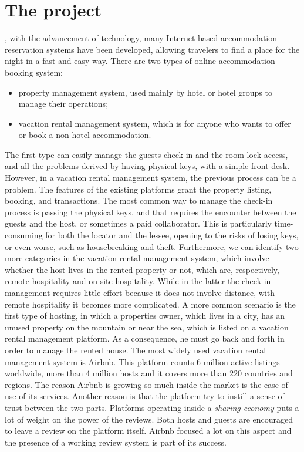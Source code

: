 \chapter{The project}
\label{cap:one}
, with the advancement of technology, many Internet-based accommodation reservation systems have been developed, allowing travelers to find a place for the night in a fast and easy way. There are two types of online accommodation booking system\cite{9295937}:
\begin{itemize}
    \item property management system, used mainly by hotel or hotel groups to manage their operations;
    \item vacation rental management system, which is for anyone who wants to offer or book a non-hotel accommodation.
\end{itemize}
The first type can easily manage the guests check-in and the room lock access, and all the problems derived by having physical keys, with a simple front desk. However, in a vacation rental management system, the previous process can be a problem. The features of the existing platforms grant the property listing, booking, and transactions. The most common way to manage the check-in process is passing the physical keys, and that requires the encounter between the guests and the host, or sometimes a paid collaborator. This is particularly time-consuming for both the locator and the lessee, opening to the risks of losing keys, or even worse, such as housebreaking and theft. 
Furthermore, we can identify two more categories in the vacation rental management system, which involve whether the host lives in the rented property or not, which are, respectively, remote hospitality and on-site hospitality\cite{10.1145/2675133.2675274}. While in the latter the check-in management requires little effort because it does not involve distance, with remote hospitality it becomes more complicated. A more common scenario is the first type of hosting, in which a properties owner, which lives in a city, has an unused property on the mountain or near the sea, which is listed on a vacation rental management platform. As a consequence, he must go back and forth in order to manage the rented house.
The most widely used vacation rental management system is Airbnb. This platform counts 6 million active listings worldwide, more than 4 million hosts and it covers more than 220 countries and regions. The reason Airbnb is growing so much inside the market is the ease-of-use of its services. Another reason is that the platform try to instill a sense of trust between the two parts. Platforms operating inside a \textit{sharing economy} \cite{10.1145/3334480.3382900} puts a lot of weight on the power of the reviews. Both hosts and guests are encouraged to leave a review on the platform itself. Airbnb focused a lot on this aspect and the presence of a working review system is part of its success.
